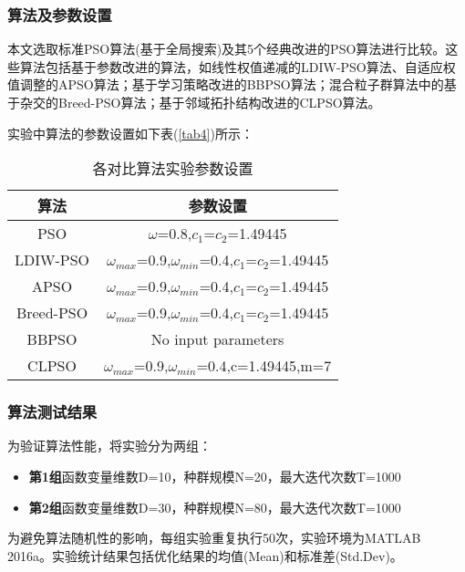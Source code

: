 \subsubsection{算法及参数设置}
本文选取标准PSO算法(基于全局搜索)及其5个经典改进的PSO算法进行比较。这些算法包括基于参数改进的算法，如线性权值递减的LDIW-PSO算法、自适应权值调整的APSO算法；基于学习策略改进的BBPSO算法；混合粒子群算法中的基于杂交的Breed-PSO算法；基于邻域拓扑结构改进的CLPSO算法。

实验中算法的参数设置如下表(\ref{tab4})所示：

\begin{table}[htbp]
	\centering
	\label{tab4}
	\caption{各对比算法实验参数设置}
	\begin{tabular}{cc}
		\toprule[1.5pt]
		\textbf{算法} & \textbf{参数设置} \\
		\midrule[1pt]
		PSO   & $\omega$=0.8,$ c_1 $=$ c_2 $=1.49445 \\
		LDIW-PSO & $\omega_{max}$=0.9,$\omega_{min}$=0.4,$ c_1 $=$ c_2 $=1.49445 \\
		APSO  & $\omega_{max}$=0.9,$\omega_{min}$=0.4,$ c_1 $=$ c_2 $=1.49445 \\
		Breed-PSO & $\omega_{max}$=0.9,$\omega_{min}$=0.4,$ c_1 $=$ c_2 $=1.49445 \\
		BBPSO & No input parameters \\
		CLPSO & $\omega_{max}$=0.9,$\omega_{min}$=0.4,c=1.49445,m=7 \\
		\bottomrule[1.5pt]
	\end{tabular}%
	\label{tab:addlabel}%
\end{table}%





\newpage

\subsubsection{算法测试结果}
为验证算法性能，将实验分为两组：
\begin{itemize}
	\item \textbf{第1组}函数变量维数D=10，种群规模N=20，最大迭代次数T=1000
	\item \textbf{第2组}函数变量维数D=30，种群规模N=80，最大迭代次数T=1000
\end{itemize}

为避免算法随机性的影响，每组实验重复执行50次，实验环境为MATLAB 2016a。实验统计结果包括优化结果的均值(Mean)和标准差(Std.Dev)。

